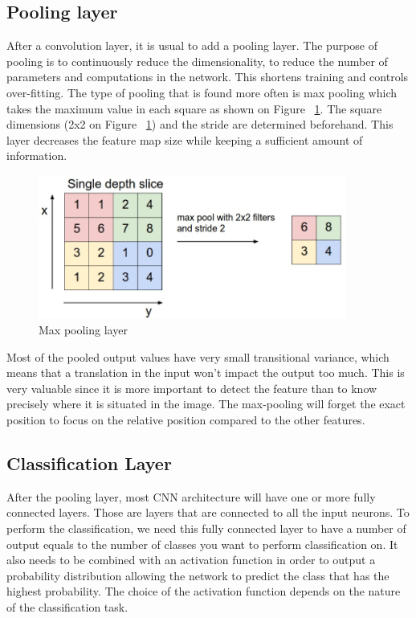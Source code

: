 \subsection{Pooling layer}
After a convolution layer, it is usual to add a pooling layer. The purpose of pooling is to continuously reduce the dimensionality, to reduce the number of parameters and computations in the network. This shortens training and controls over-fitting.
The type of pooling that is found more often is max pooling which takes the maximum value in each square as shown on Figure ~\ref{fig:maxpool}. The square dimensions (2x2 on Figure ~\ref{fig:maxpool})  and the stride are determined beforehand. This layer decreases the feature map size while keeping a sufficient amount of information. 

	\begin{figure}[!htp]
    \centering
        \includegraphics[width=0.9\textwidth]{./figures/02-maxpool}
        \caption{Max pooling layer}\label{fig:maxpool}
    \end{figure}
 
   
Most of the pooled output values have very small transitional variance, which means that a translation in the input won't impact the output too much. This is very valuable since it is more important to detect the feature than to know precisely where it is situated in the image. The max-pooling will forget the exact position to focus on the relative position compared to the other features.

\subsection{Classification Layer}
\label{sec:class_lay}
After the pooling layer, most CNN architecture will have one or more fully connected layers. Those are layers that are connected to all the input neurons. To perform the classification, we need this fully connected layer to have a number of output equals to the number of classes you want to perform classification on. It also needs to be combined with an activation function in order to output a probability distribution allowing the network to predict the class that has the highest probability. The choice of the activation function depends on the nature of the classification task.
